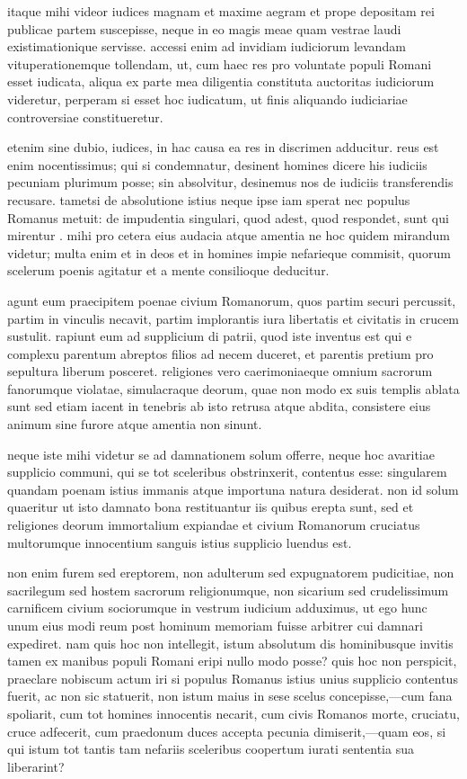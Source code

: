  itaque mihi videor iudices magnam et maxime aegram et prope depositam rei publicae partem suscepisse, neque in eo magis meae quam vestrae laudi existimationique servisse. accessi enim ad invidiam iudiciorum levandam vituperationemque tollendam, ut, cum haec res pro voluntate populi Romani esset iudicata, aliqua ex parte mea diligentia constituta auctoritas iudiciorum videretur, perperam si esset hoc iudicatum, ut finis aliquando iudiciariae controversiae constitueretur.

 etenim sine dubio, iudices, in hac causa ea res in discrimen adducitur. reus est enim nocentissimus; qui si condemnatur, desinent homines dicere his iudiciis pecuniam plurimum posse; sin absolvitur, desinemus nos de iudiciis transferendis recusare. tametsi de absolutione istius neque ipse iam sperat nec populus Romanus metuit: de impudentia singulari, quod adest, quod respondet, sunt qui mirentur . mihi pro cetera eius audacia atque amentia ne hoc quidem mirandum videtur; multa enim et in deos et in homines impie nefarieque commisit, quorum scelerum poenis agitatur et a mente consilioque deducitur.

 agunt eum praecipitem poenae civium Romanorum, quos partim securi percussit, partim in vinculis necavit, partim implorantis iura libertatis et civitatis in crucem sustulit. rapiunt eum ad supplicium di patrii, quod iste inventus est qui e complexu parentum abreptos filios ad necem duceret, et parentis pretium pro sepultura liberum posceret. religiones vero caerimoniaeque omnium sacrorum fanorumque violatae, simulacraque deorum, quae non modo ex suis templis ablata sunt sed etiam iacent in tenebris ab isto retrusa atque abdita, consistere eius animum sine furore atque amentia non sinunt.

 neque iste mihi videtur se ad damnationem solum offerre, neque hoc avaritiae supplicio communi, qui se tot sceleribus obstrinxerit, contentus esse: singularem quandam poenam istius immanis atque importuna natura desiderat. non id solum quaeritur ut isto damnato bona restituantur iis quibus erepta sunt, sed et religiones deorum immortalium expiandae et civium Romanorum cruciatus multorumque innocentium sanguis istius supplicio luendus est.

 non enim furem sed ereptorem, non adulterum sed expugnatorem pudicitiae, non sacrilegum sed hostem sacrorum religionumque, non sicarium sed crudelissimum carnificem civium sociorumque in vestrum iudicium adduximus, ut ego hunc unum eius modi reum post hominum memoriam fuisse arbitrer cui damnari expediret. nam quis hoc non intellegit, istum absolutum dis hominibusque invitis tamen ex manibus populi Romani eripi nullo modo posse? quis hoc non perspicit, praeclare nobiscum actum iri si populus Romanus istius unius supplicio contentus fuerit, ac non sic statuerit, non istum maius in sese scelus concepisse,—cum fana spoliarit, cum tot homines innocentis necarit, cum civis Romanos morte, cruciatu, cruce adfecerit, cum praedonum duces accepta pecunia dimiserit,—quam eos, si qui istum tot tantis tam nefariis sceleribus coopertum iurati sententia sua liberarint?

